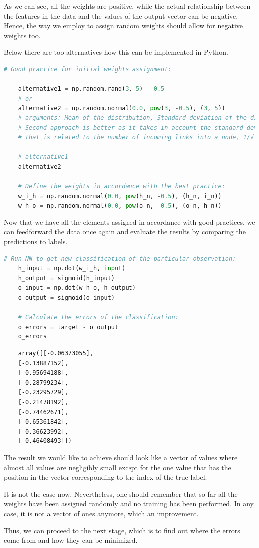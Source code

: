 As we can see, all the weights are positive, while the actual relationship between the features in the data and the values of the output vector can be negative. Hence, the way we employ to assign random weights should allow for negative weights too.

Below there are too alternatives how this can be implemented in Python.

\begin{lstlisting}[language=Python]
    # Good practice for initial weights assignment:
    
    alternative1 = np.random.rand(3, 5) - 0.5 
    # or
    alternative2 = np.random.normal(0.0, pow(3, -0.5), (3, 5)) 
    # arguments: Mean of the distribution, Standard deviation of the distribution, Output shape.
    # Second approach is better as it takes in account the standard deviation 
    # that is related to the number of incoming links into a node, 1/√(number of incoming links).
    
    # alternative1
    alternative2

    # Define the weights in accordance with the best practice:
    w_i_h = np.random.normal(0.0, pow(h_n, -0.5), (h_n, i_n))
    w_h_o = np.random.normal(0.0, pow(o_n, -0.5), (o_n, h_n))
\end{lstlisting}

Now that we have all the elements assigned in accordance with good practices, we can feedforward the data once again and evaluate the results by comparing the predictions to labels.

\begin{lstlisting}[language=Python]
    # Run NN to get new classification of the particular observation:
    h_input = np.dot(w_i_h, input)
    h_output = sigmoid(h_input)
    o_input = np.dot(w_h_o, h_output)
    o_output = sigmoid(o_input)

    # Calculate the errors of the classification:
    o_errors = target - o_output
    o_errors
\end{lstlisting}

\begin{lstlisting}
    array([[-0.06373055],
    [-0.13887152],
    [-0.95694188],
    [ 0.28799234],
    [-0.23295729],
    [-0.21478192],
    [-0.74462671],
    [-0.65361842],
    [-0.36623992],
    [-0.46408493]])
\end{lstlisting}

The result we would like to achieve should look like a vector of values where almost all values are negligibly small except for the one value that has the position in the vector corresponding to the index of the true label. 

It is not the case now. Nevertheless, one should remember that so far all the weights have been assigned randomly and no training has been performed. In any case, it is not a vector of ones anymore, which an improvement.

Thus, we can proceed to the next stage, which is to find out where the errors come from and how they can be minimized.